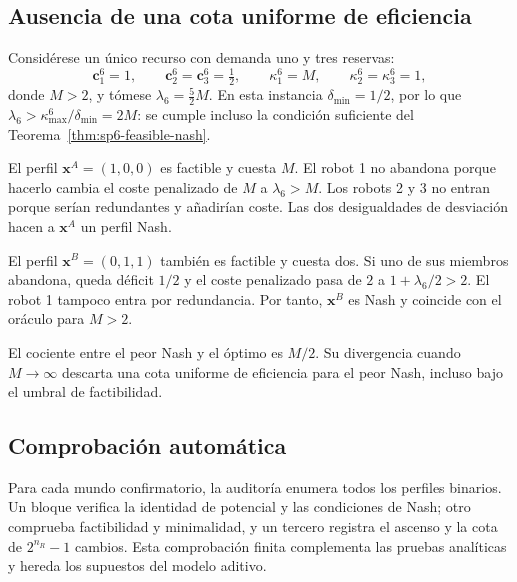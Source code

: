 \subsection{Ausencia de una cota uniforme de eficiencia}
\label{app:sp6-poa-proof}

Considérese un único recurso con demanda uno y tres reservas:
\[
 \boldsymbol c_1^6=1,
 \qquad \boldsymbol c_2^6=\boldsymbol c_3^6=\tfrac12,
 \qquad
 \kappa_1^6=M,
 \qquad \kappa_2^6=\kappa_3^6=1,
\]
donde $M>2$, y tómese $\lambda_6=\tfrac52M$. En esta instancia $\delta_{\min}=1/2$, por lo que $\lambda_6>\kappa_{\max}^6/\delta_{\min}=2M$: se cumple incluso la condición suficiente del Teorema~\ref{thm:sp6-feasible-nash}.

El perfil $\boldsymbol x^A=(1, 0, 0)$ es factible y cuesta $M$. El robot 1 no abandona porque hacerlo cambia el coste penalizado de $M$ a $\lambda_6>M$. Los robots 2 y 3 no entran porque serían redundantes y añadirían coste. Las dos desigualdades de desviación hacen a \(\boldsymbol x^A\) un perfil Nash.

El perfil $\boldsymbol x^B=(0, 1, 1)$ también es factible y cuesta dos. Si uno de sus miembros abandona, queda déficit $1/2$ y el coste penalizado pasa de $2$ a $1+\lambda_6/2>2$. El robot 1 tampoco entra por redundancia. Por tanto, $\boldsymbol x^B$ es Nash y coincide con el oráculo para $M>2$.

El cociente entre el peor Nash y el óptimo es \(M/2\). Su divergencia cuando \(M\to\infty\) descarta una cota uniforme de eficiencia para el peor Nash, incluso bajo el umbral de factibilidad.

\subsection{Comprobación automática}

Para cada mundo confirmatorio, la auditoría enumera todos los perfiles binarios. Un bloque verifica la identidad de potencial y las condiciones de Nash; otro comprueba factibilidad y minimalidad, y un tercero registra el ascenso y la cota de \(2^{n_R}-1\) cambios. Esta comprobación finita complementa las pruebas analíticas y hereda los supuestos del modelo aditivo.
